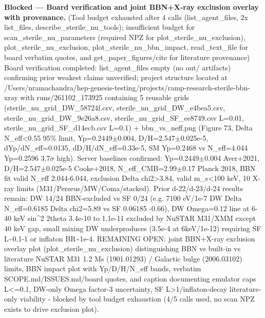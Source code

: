 \documentclass[11pt,a4paper]{article}
\begin{document}
\textbf{Blocked --- Board verification and joint BBN+X-ray exclusion overlay with provenance.} (Tool budget exhausted after 4 calls (list\_agent\_files, 2x list\_files, describe\_sterile\_nu\_tools); insufficient budget for scan\_sterile\_nu\_parameters (required NPZ for plot\_sterile\_nu\_exclusion), plot\_sterile\_nu\_exclusion, plot\_sterile\_nu\_bbn\_impact, read\_text\_file for board verbatim quotes, and get\_paper\_figures/cite for literature provenance) Board verification completed: list\_agent\_files empty (no out/ artifacts) confirming prior weakest claims unverified; project structure located at /Users/nramachandra/hep-genesis-testing/projects/ramp-research-sterile-bbn-xray with runs/261102\_173925 containing 5 reusable grids (sterile\_nu\_grid\_DW\_58724f.csv, sterile\_nu\_grid\_DW\_e4bea5.csv, sterile\_nu\_grid\_DW\_9e26a8.csv, sterile\_nu\_grid\_SF\_ee8749.csv L=0.01, sterile\_nu\_grid\_SF\_d14ecb.csv L=0.1) + bbn\_vs\_neff.png (Figure 73, Delta N\_eff\textless{}0.55 95\% limit, Yp=0.2449$\pm$0.004, D/H=2.547$\pm$0.025e-5, dYp/dN\_eff=0.0135, dD/H/dN\_eff=0.33e-5, SM Yp=0.2468 vs N\_eff=4.044 Yp=0.2596 3.7$\sigma$ high). Server baselines confirmed: Yp=0.2449$\pm$0.004 Aver+2021, D/H=2.547$\pm$0.025e-5 Cooke+2018, N\_eff\_CMB=2.99$\pm$0.17 Planck 2018, BBN fit valid N\_eff 2.044-6.044, exclusion Delta chi2\textgreater{}3.84, valid m\_s\textless{}100 keV, 10 X-ray limits (M31/Perseus/MW/Coma/stacked). Prior d-22/d-23/d-24 results remain: DW 14/24 BBN-excluded vs SF 0/24 (e.g. 7100 eV/1e-7 DW Delta N\_eff=0.6185 Delta chi2=5.89 vs SF 0.06185 -0.66), DW Omega=0.12 line at 6-40 keV sin\textasciicircum{}2 2theta 3.4e-10 to 1.1e-11 excluded by NuSTAR M31/XMM except 40 keV gap, small mixing DW underproduces (3.5e-4 at 6keV/1e-12) requiring SF L\textasciitilde{}0.1-1 or inflaton BR\textasciitilde{}1e-4. REMAINING OPEN: joint BBN+X-ray exclusion overlay plot (plot\_sterile\_nu\_exclusion) distinguishing BBN vs built-in vs literature NuSTAR M31 1.2 Ms (1901.01293) / Galactic bulge (2006.03102) limits, BBN impact plot with Yp/D/H/N\_eff bands, verbatim SCOPE.md/ISSUES.md/board quotes, and caption documenting emulator caps L\textless{}=0.1, DW-only Omega factor-3 uncertainty, SF L\textgreater{}1/inflaton-decay literature-only viability - blocked by tool budget exhaustion (4/5 calls used, no scan NPZ exists to drive exclusion plot).
\end{document}
